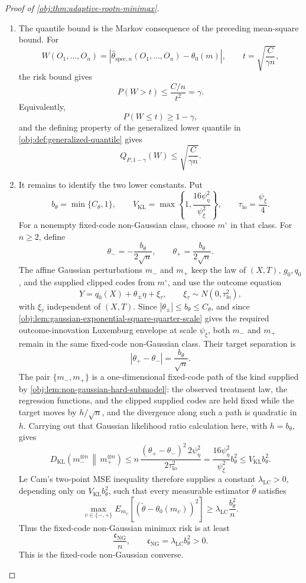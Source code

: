 \begin{proof}[Proof of \cref{obj:thm:adaptive-rootn-minimax}]
\begin{enumerate}
\item The quantile bound is the Markov consequence of the preceding mean-square bound.  For
\[
W(O_1,\ldots,O_n)
=
|\widehat\theta_{\mathrm{spec},n}(O_1,\ldots,O_n)-\theta_0(m)|,
\qquad
t=\sqrt{\frac{C}{\gamma n}},
\]
the risk bound gives
\[
P(W>t)\le \frac{C/n}{t^2}=\gamma.
\]
Equivalently,
\[
P(W\le t)\ge 1-\gamma,
\]
and the defining property of the generalized lower quantile in \cref{obj:def:generalized-quantile} gives
\[
Q_{P,1-\gamma}(W)\le \sqrt{\frac{C}{\gamma n}}.
\]

\item It remains to identify the two lower constants.  Put
\[
b_{\theta}=\min\{C_{\theta},1\},
\qquad
V_{\mathrm{KL}}=\max\left\{1,\frac{16\psi_{\eta}^2}{\psi_{\xi}^2}\right\},
\qquad
\tau_{\mathrm{lo}}=\frac{\psi_{\xi}}4.
\]
For a nonempty fixed-code non-Gaussian class, choose \(m^{\circ}\) in that class.  For \(n\ge2\), define
\[
\theta_-=-\frac{b_{\theta}}{2\sqrt n},
\qquad
\theta_+=\frac{b_{\theta}}{2\sqrt n}.
\]
The affine Gaussian perturbations \(m_-\) and \(m_+\) keep the law of \((X,T)\), \(g_0,q_0\), and the supplied clipped codes from \(m^{\circ}\), and use the outcome equation
\[
Y=q_0(X)+\theta_{\pm}\eta+\xi_{\tau},
\qquad
\xi_{\tau}\sim N(0,\tau_{\mathrm{lo}}^2),
\]
with \(\xi_{\tau}\) independent of \((X,T)\).  Since \(|\theta_{\pm}|\le b_{\theta}\le C_{\theta}\), and since \cref{obj:lem:gaussian-exponential-square-quarter-scale} gives the required outcome-innovation Luxemburg envelope at scale \(\psi_{\xi}\), both \(m_-\) and \(m_+\) remain in the same fixed-code non-Gaussian class.  Their target separation is
\[
|\theta_+-\theta_-|=\frac{b_{\theta}}{\sqrt n}.
\]
The pair \(\{m_-,m_+\}\) is a one-dimensional fixed-code path of the kind supplied by \cref{obj:lem:non-gaussian-hard-submodel}: the observed treatment law, the regression functions, and the clipped supplied codes are held fixed while the target moves by \(h/\sqrt n\), and the divergence along such a path is quadratic in \(h\).  Carrying out that Gaussian likelihood ratio calculation here, with \(h=b_{\theta}\), gives
\[
D_{\mathrm{KL}}\!\left(m_-^{\otimes n}\,\middle\|\,m_+^{\otimes n}\right)
\le
n\,\frac{(\theta_+-\theta_-)^2\,2\psi_{\eta}^2}{2\tau_{\mathrm{lo}}^2}
=
\frac{16\psi_{\eta}^2}{\psi_{\xi}^2}b_{\theta}^2
\le
V_{\mathrm{KL}}b_{\theta}^2.
\]
Le Cam's two-point MSE inequality therefore supplies a constant \(\lambda_{\mathrm{LC}}>0\), depending only on \(V_{\mathrm{KL}}b_{\theta}^2\), such that every measurable estimator \(\widetilde\theta\) satisfies
\[
\max_{\upsilon\in\{-,+\}}
E_{m_{\upsilon}}\!\left[
(\widetilde\theta-\theta_0(m_{\upsilon}))^2
\right]
\ge
\lambda_{\mathrm{LC}}\frac{b_{\theta}^2}{n}.
\]
Thus the fixed-code non-Gaussian minimax risk is at least
\[
\frac{\mathfrak c_{\mathrm{NG}}}{n},
\qquad
\mathfrak c_{\mathrm{NG}}=\lambda_{\mathrm{LC}}b_{\theta}^2>0.
\]
This is the fixed-code non-Gaussian converse. %


\end{enumerate}
\end{proof}
